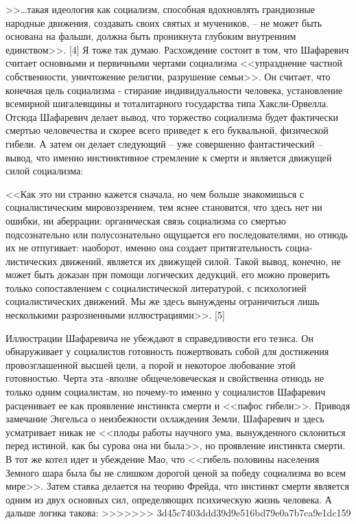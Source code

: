 \documentclass{book}
\begin{document}
>>\ldots такая идеология как социализм, способная вдохновлять грандиозные народные движения, создавать своих святых и му­чеников, -- не может быть основана на фальши, должна быть проникнута глубоким внутренним единством>>. [4]
Я тоже так думаю. Расхождение состоит в том, что Шафаревич считает основными и первичными чертами социализма <<упразднение частной собственности, уничтожение религии, раз­рушение семьи>>. Он считает, что конечная цель социализма - стирание индивидуальности человека, установление всемирной шигалевщины и тоталитарного государства типа Хаксли-Орвелла. Отсюда Шафаревич делает вывод, что торжество социализ­ма будет фактически смертью человечества и скорее всего при­ведет к его буквальной, физической гибели. А затем он делает следующий -- уже совершенно фантастический -- вывод, что именно инстинктивное стремление к смерти и является движу­щей силой социализма:

<<Как это ни странно кажется сначала, но чем больше знако­мишься с социалистическим мировоззрением, тем яснее стано­вится, что здесь нет ни ошибки, ни аберрации: органическая связь социализма со смертью подсознательно или полусозна­тельно ощущается его последователями, но отнюдь их не отпу­гивает: наоборот, именно она создает притягательность социа­листических движений, является их движущей силой. Такой вывод, конечно, не может быть доказан при помощи логиче­ских дедукций, его можно проверить только сопоставлением с социалистической литературой, с психологией социалисти­ческих движений. Мы же здесь вынуждены ограничиться лишь несколькими разрозненными иллюстрациями>>. [5]

Иллюстрации Шафаревича не убеждают в справедливости его тезиса. Он обнаруживает у социалистов готовность пожертво­вать собой для достижения провозглашенной высшей цели, а порой и некоторое любование этой готовностью. Черта эта -вполне общечеловеческая и свойственна отнюдь не только од­ним социалистам, но почему-то именно у социалистов Шафаревич расценивает ее как проявление инстинкта смерти и <<пафос гибели>>. Приводя замечание Энгельса о неизбежности охлажде­ния Земли, Шафаревич и здесь усматривает никак не <<плоды работы научного ума, вынужденного склониться перед истиной, как бы сурова она ни была>>, но проявление инстинкта смерти. В тот же котел идет и убеждение Мао, что <<гибель половины на­селения Земного шара была бы не слишком дорогой ценой за победу социализма во всем мире>>. Затем ставка делается на тео­рию Фрейда, что инстинкт смерти является одним из двух основ­ных сил, определяющих психическую жизнь человека. А даль­ше логика такова:
>>>>>>> 3d45c7403ddd39d9e516bd79e0a7b7ca9e1dc159
\end{document}
